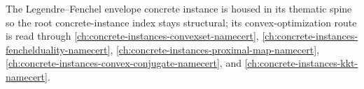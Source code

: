 The Legendre--Fenchel envelope concrete instance is housed in its thematic spine so the root concrete-instance index stays structural; its convex-optimization route is read through \autoref{ch:concrete-instances-convexset-namecert}, \autoref{ch:concrete-instances-fenchelduality-namecert}, \autoref{ch:concrete-instances-proximal-map-namecert}, \autoref{ch:concrete-instances-convex-conjugate-namecert}, and \autoref{ch:concrete-instances-kkt-namecert}.


